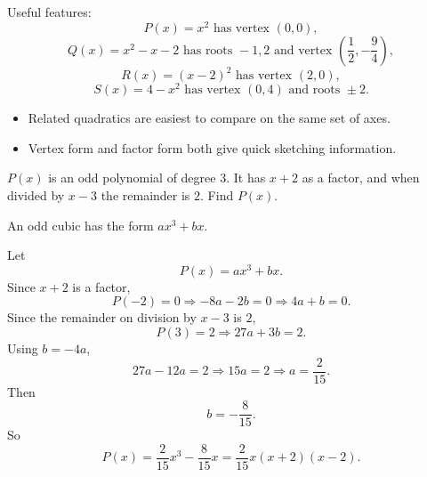 \begin{solution}
Useful features:
\[
P(x)=x^2 \text{ has vertex }(0,0),
\]
\[
Q(x)=x^2-x-2 \text{ has roots }-1,2 \text{ and vertex }\left(\frac12,-\frac94\right),
\]
\[
R(x)=(x-2)^2 \text{ has vertex }(2,0),
\]
\[
S(x)=4-x^2 \text{ has vertex }(0,4)\text{ and roots }\pm2.
\]

\begin{center}
\end{center}
\end{solution}

\begin{takeaways}
\begin{itemize}[leftmargin=*]
\item Related quadratics are easiest to compare on the same set of axes.
\item Vertex form and factor form both give quick sketching information.
\end{itemize}
\end{takeaways}

\begin{problem}
$P(x)$ is an odd polynomial of degree $3$. It has $x+2$ as a factor, and when divided by $x-3$ the remainder is $2$. Find $P(x)$.
\end{problem}

\begin{hintbox}
An odd cubic has the form $ax^3+bx$.
\end{hintbox}

\begin{solution}
Let
\[
P(x)=ax^3+bx.
\]
Since $x+2$ is a factor,
\[
P(-2)=0 \Rightarrow -8a-2b=0 \Rightarrow 4a+b=0.
\]
Since the remainder on division by $x-3$ is $2$,
\[
P(3)=2 \Rightarrow 27a+3b=2.
\]
Using $b=-4a$,
\[
27a-12a=2 \Rightarrow 15a=2 \Rightarrow a=\frac{2}{15}.
\]
Then
\[
b=-\frac{8}{15}.
\]
So
\[
\boxed{P(x)=\frac{2}{15}x^3-\frac{8}{15}x=\frac{2}{15}x(x+2)(x-2).}
\]
\end{solution}

